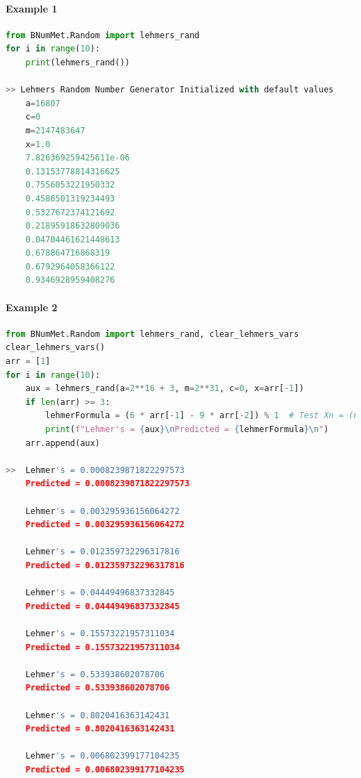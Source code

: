 \paragraph{Example 1}{
\begin{lstlisting}[language=Python]
from BNumMet.Random import lehmers_rand
for i in range(10):
    print(lehmers_rand())

>> Lehmers Random Number Generator Initialized with default values
	a=16807
	c=0
	m=2147483647
	x=1.0
    7.826369259425611e-06
    0.13153778814316625
    0.7556053221950332
    0.4586501319234493
    0.5327672374121692
    0.21895918632809036
    0.04704461621448613
    0.678864716868319
    0.6792964058366122
    0.9346928959408276
\end{lstlisting}
}
\paragraph{Example 2}{
\begin{lstlisting}[language=Python]
from BNumMet.Random import lehmers_rand, clear_lehmers_vars
clear_lehmers_vars()
arr = [1]
for i in range(10):
    aux = lehmers_rand(a=2**16 + 3, m=2**31, c=0, x=arr[-1])
    if len(arr) >= 3:
        lehmerFormula = (6 * arr[-1] - 9 * arr[-2]) % 1  # Test Xn = (6Xn-1 - 9Xn-2)
        print(f"Lehmer's = {aux}\nPredicted = {lehmerFormula}\n")
    arr.append(aux)

>>  Lehmer's = 0.0008239871822297573
    Predicted = 0.0008239871822297573
    
    Lehmer's = 0.003295936156064272
    Predicted = 0.003295936156064272
    
    Lehmer's = 0.012359732296317816
    Predicted = 0.012359732296317816
    
    Lehmer's = 0.04449496837332845
    Predicted = 0.04449496837332845
    
    Lehmer's = 0.15573221957311034
    Predicted = 0.15573221957311034
    
    Lehmer's = 0.533938602078706
    Predicted = 0.533938602078706
    
    Lehmer's = 0.8020416363142431
    Predicted = 0.8020416363142431
    
    Lehmer's = 0.006802399177104235
    Predicted = 0.006802399177104235
\end{lstlisting}
}
